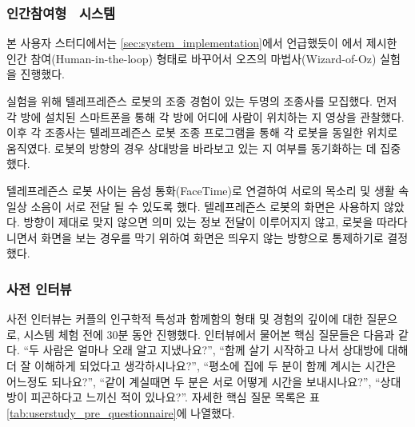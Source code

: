 \subsubsection{인간참여형 \sysname\ 시스템}

본 사용자 스터디에서는 \ref{sec:system_implementation}에서 언급했듯이 \cite{kang2018homemeld}에서 제시한 \sysname\을 인간 참여(Human-in-the-loop) 형태로 바꾸어서 오즈의 마법사(Wizard-of-Oz) 실험을 진행했다.

실험을 위해 텔레프레즌스 로봇의\cite{double_robotics} 조종 경험이 있는 두명의 조종사를 모집했다. 먼저 각 방에 설치된 스마트폰을 통해 각 방에 어디에 사람이 위치하는 지 영상을 관찰했다. 이후 각 조종사는 텔레프레즌스 로봇 조종 프로그램을\cite{double_drive} 통해 각 로봇을 동일한 위치로 움직였다. 로봇의 방향의 경우 상대방을 바라보고 있는 지 여부를 동기화하는 데 집중했다.

텔레프레즌스 로봇 사이는 음성 통화(FaceTime)로 연결하여 서로의 목소리 및 생활 속 일상 소음이 서로 전달 될 수 있도록 했다. 텔레프레즌스 로봇의 화면은 사용하지 않았다. 방향이 제대로 맞지 않으면 의미 있는 정보 전달이 이루어지지 않고, 로봇을 따라다니면서 화면을 보는 경우를 막기 위하여 화면은 띄우지 않는 방향으로 통제하기로 결정했다.


\subsubsection{사전 인터뷰}

사전 인터뷰는 커플의 인구학적 특성과 함께함의 형태 및 경험의 깊이에 대한 질문으로, 시스템 체험 전에 30분 동안 진행했다. 인터뷰에서 물어본 핵심 질문들은 다음과 같다. ``두 사람은 얼마나 오래 알고 지냈나요?'', ``함께 살기 시작하고 나서 상대방에 대해 더 잘 이해하게 되었다고 생각하시나요?'', ``평소에 집에 두 분이 함께 계시는 시간은 어느정도 되나요?'', ``같이 계실때면 두 분은 서로 어떻게 시간을 보내시나요?'', ``상대방이 피곤하다고 느끼신 적이 있나요?''. 자세한 핵심 질문 목록은 표 \ref{tab:userstudy_pre_questionnaire}에 나열했다.


